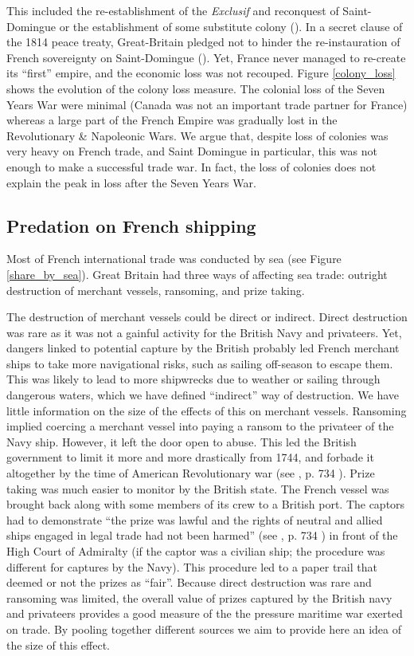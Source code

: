 \documentclass[12pt,a4paper,notitlepage,english]{article}
\begin{document}
This included the re-establishment of the \textit{Exclusif} and reconquest of Saint-Domingue or the establishment of some substitute colony (\cite{Todd2011}). In a secret clause of the 1814 peace treaty, Great-Britain pledged not to hinder the re-instauration of French sovereignty on Saint-Domingue (\cite{Schefer1907}). Yet, France never managed to re-create its ``first'' empire, and the economic loss was not recouped.
Figure \ref{colony_loss} shows the evolution of the colony loss measure. The colonial loss of the Seven Years War were minimal (Canada was not an important trade partner for France) whereas a large part of the French Empire was gradually lost in the Revolutionary \& Napoleonic Wars. We argue that, despite loss of colonies was very heavy on French trade, and Saint Domingue in particular, this was not enough to make a successful trade war. In fact, the loss of colonies does not explain the peak in loss after the Seven Years War.  
\subsection{Predation on French shipping}\label{section:DestructionofFrenchshipping}
Most of French international trade was conducted by sea (see Figure \ref{share_by_sea}). 
Great Britain had three ways of affecting sea trade: outright destruction of merchant vessels, ransoming, and prize taking.

The destruction of merchant vessels could be direct or indirect. Direct destruction was rare as it was not a gainful activity for the British Navy and privateers.
Yet, dangers linked to potential capture by the British probably led French merchant ships to take more navigational risks, such as sailing off-season to escape them. This was likely to lead to more shipwrecks due to weather or sailing through dangerous waters, which we have defined ``indirect'' way of destruction. We have little information on the size of the effects of this on merchant vessels.
Ransoming implied coercing a merchant vessel into paying a ransom to the privateer of the Navy ship. However, it left the door open to abuse. This led the British government to limit it more and more drastically from 1744, and forbade it altogether by the time of American Revolutionary war (see \cite{Hillmann2011}, p. 734 ). 
Prize taking was much easier to monitor by the British state.
The French vessel was brought back along with some members of its crew to a British port.
The captors had to demonstrate ``the prize was lawful and the rights of neutral and allied ships engaged in legal trade had not been harmed'' (see \cite{Hillmann2011}, p. 734 ) in front of the High Court of Admiralty (if the captor was a civilian ship; the procedure was different for captures by the Navy).
This procedure led to a paper trail that deemed or not the prizes as ``fair''.
Because direct destruction was rare and ransoming was limited, the overall value of prizes captured by the British navy and privateers provides a good measure of the the pressure maritime war exerted on trade.
By pooling together different sources we aim to provide here an idea of the size of this effect. 
\end{document}
